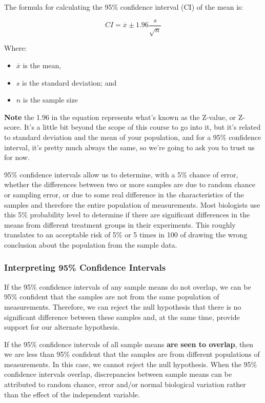 \documentclass[
]{book}
\providecommand{\tightlist}{%
  \setlength{\itemsep}{0pt}\setlength{\parskip}{0pt}}
\begin{document}
The formula for calculating the 95\% confidence interval (CI) of the mean is:

\[CI=\overline{x}\pm 1.96 \frac{s}{\sqrt{n}}\]

Where:

\begin{itemize}
\tightlist
\item
  \(\overline{x}\) is the mean,
\item
  \(s\) is the standard deviation; and
\item
  \(n\) is the sample size
\end{itemize}

\textbf{Note} the 1.96 in the equation represents what's known as the Z-value, or Z-score. It's a little bit beyond the scope of this course to go into it, but it's related to standard deviation and the mean of your population, and for a 95\% confidence interval, it's pretty much always the same, so we're going to ask you to trust us for now.

95\% confidence intervals allow us to determine, with a 5\% chance of error, whether the differences between two or more samples are due to random chance or sampling error, or due to some real difference in the characteristics of the samples and therefore the entire population of measurements. Most biologists use this 5\% probability level to determine if there are significant differences in the means from different treatment groups in their experiments. This roughly translates to an acceptable risk of 5\% or 5 times in 100 of drawing the wrong conclusion about the population from the sample data.

\hypertarget{interpreting-95-confidence-intervals}{%
\subsubsection*{Interpreting 95\% Confidence Intervals}\label{interpreting-95-confidence-intervals}}

If the 95\% confidence intervals of any sample means do not overlap, we can be 95\% confident that the samples are not from the same population of measurements. Therefore, we can reject the null hypothesis that there is no significant difference between these samples and, at the same time, provide support for our alternate hypothesis.

If the 95\% confidence intervals of all sample means \textbf{are seen to overlap}, then we are less than 95\% confident that the samples are from different populations of measurements. In this case, we cannot reject the null hypothesis. When the 95\% confidence intervals overlap, discrepancies between sample means can be attributed to random chance, error and/or normal biological variation rather than the effect of the independent variable.
\end{document}
